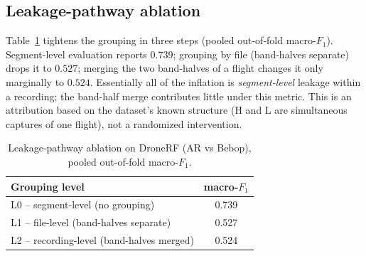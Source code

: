 \documentclass[11pt]{article}
\begin{document}
\subsection{Leakage-pathway ablation}
Table~\ref{tab:abl} tightens the grouping in three steps (pooled out-of-fold macro-$F_1$). Segment-level evaluation reports $0.739$; grouping by file (band-halves separate) drops it to $0.527$; merging the two band-halves of a flight changes it only marginally to $0.524$. Essentially all of the inflation is \emph{segment-level} leakage within a recording; the band-half merge contributes little under this metric. This is an attribution based on the dataset's known structure (H and L are simultaneous captures of one flight), not a randomized intervention.

\begin{table}[t]\centering
\caption{Leakage-pathway ablation on DroneRF (AR vs Bebop), pooled out-of-fold macro-$F_1$.}
\label{tab:abl}
\begin{tabular}{lc}
\toprule
Grouping level & macro-$F_1$ \\
\midrule
L0 -- segment-level (no grouping) & 0.739 \\
L1 -- file-level (band-halves separate) & 0.527 \\
L2 -- recording-level (band-halves merged) & 0.524 \\
\bottomrule
\end{tabular}
\end{table}
\end{document}
